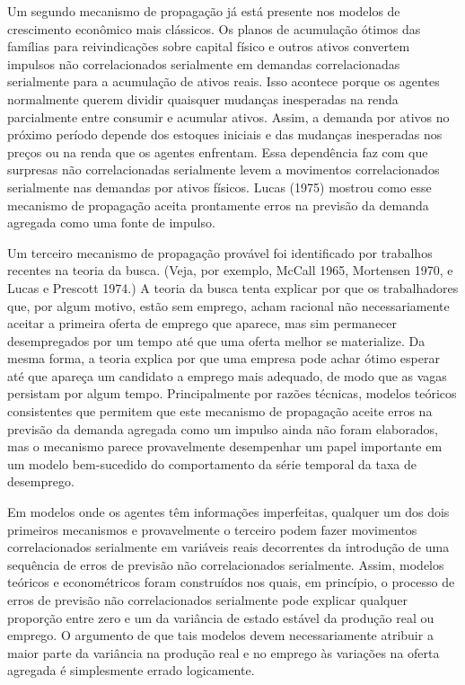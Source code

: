\documentclass[12pt]{article}
\begin{document}
Um segundo mecanismo de propagação já está presente nos modelos de crescimento econômico mais clássicos. Os planos de acumulação ótimos das famílias para reivindicações sobre capital físico e outros ativos convertem impulsos não correlacionados serialmente em demandas correlacionadas serialmente para a acumulação de ativos reais. Isso acontece porque os agentes normalmente querem dividir quaisquer mudanças inesperadas na renda parcialmente entre consumir e acumular ativos. Assim, a demanda por ativos no próximo período depende dos estoques iniciais e das mudanças inesperadas nos preços ou na renda que os agentes enfrentam. Essa dependência faz com que surpresas não correlacionadas serialmente levem a movimentos correlacionados serialmente nas demandas por ativos físicos. Lucas (1975) mostrou como esse mecanismo de propagação aceita prontamente erros na previsão da demanda agregada como uma fonte de impulso.

Um terceiro mecanismo de propagação provável foi identificado por trabalhos recentes na teoria da busca. (Veja, por exemplo, McCall 1965, Mortensen 1970, e Lucas e Prescott 1974.) A teoria da busca tenta explicar por que os trabalhadores que, por algum motivo, estão sem emprego, acham racional não necessariamente aceitar a primeira oferta de emprego que aparece, mas sim permanecer desempregados por um tempo até que uma oferta melhor se materialize. Da mesma forma, a teoria explica por que uma empresa pode achar ótimo esperar até que apareça um candidato a emprego mais adequado, de modo que as vagas persistam por algum tempo. Principalmente por razões técnicas, modelos teóricos consistentes que permitem que este mecanismo de propagação aceite erros na previsão da demanda agregada como um impulso ainda não foram elaborados, mas o mecanismo parece provavelmente desempenhar um papel importante em um modelo bem-sucedido do comportamento da série temporal da taxa de desemprego.

Em modelos onde os agentes têm informações imperfeitas, qualquer um dos dois primeiros mecanismos e provavelmente o terceiro podem fazer movimentos correlacionados serialmente em variáveis reais decorrentes da introdução de uma sequência de erros de previsão não correlacionados serialmente. Assim, modelos teóricos e econométricos foram construídos nos quais, em princípio, o processo de erros de previsão não correlacionados serialmente pode explicar qualquer proporção entre zero e um da variância de estado estável da produção real ou emprego. O argumento de que tais modelos devem necessariamente atribuir a maior parte da variância na produção real e no emprego às variações na oferta agregada é simplesmente errado logicamente.
\end{document}
